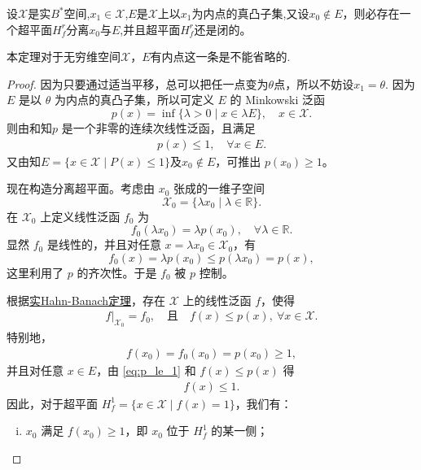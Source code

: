 \documentclass[../../main.tex]{subfiles}%
\begin{document}
\begin{theorem}\label{theorem:Hahn-Banach定理的几何形式}
设$\mathscr{X}$是实$B^*$空间,$x_1\in \mathscr{X}$,$E$是$\mathscr{X}$上以$x_1$为内点的真凸子集,又设$x_0 \notin E$，则必存在一个超平面$H_f^r$分离$x_0$与$E$,并且超平面$H_f^r$还是闭的。
\end{theorem}
\begin{remark}
本定理对于无穷维空间$\mathscr{X}$，$E$有内点这一条是不能省略的.
\end{remark}
\begin{proof}
因为只要通过适当平移，总可以把任一点变为$\theta$点，所以不妨设$x_1=\theta$.
因为 $E$ 是以 $\theta$ 为内点的真凸子集，所以可定义 $E$ 的 Minkowski 泛函
\[
p(x) = \inf\{\lambda > 0 \mid x \in \lambda E\}, \quad x \in \mathscr{X}.
\]
则由和知$p$ 是一个非零的连续次线性泛函，且满足
\begin{align}\label{eq:p_le_1}
p(x) \leqslant 1,\quad\forall x \in E.
\end{align}
又由知$E=\{x\in \mathscr{X}\mid P(x)\leqslant 1\}$及$x_0 \notin E$，可推出 $p(x_0) \geqslant 1$。

现在构造分离超平面。考虑由 $x_0$ 张成的一维子空间
\[
\mathscr{X}_0 = \{\lambda x_0 \mid \lambda \in \mathbb{R}\}.
\]
在 $\mathscr{X}_0$ 上定义线性泛函 $f_0$ 为
\[
f_0(\lambda x_0) = \lambda p(x_0), \quad \forall \lambda \in \mathbb{R}.
\]
显然 $f_0$ 是线性的，并且对任意 $x = \lambda x_0 \in \mathscr{X}_0$，有
\[
f_0(x) = \lambda p(x_0) \leqslant p(\lambda x_0) = p(x),
\]
这里利用了 $p$ 的齐次性。于是 $f_0$ 被 $p$ 控制。

根据\hyperref[theorem:泛函分析--实Hahn-Banach定理]{实Hahn-Banach定理}，存在 $\mathscr{X}$ 上的线性泛函 $f$，使得
\begin{align}
f|_{\mathscr{X}_0} = f_0, \quad \text{且} \quad f(x) \leqslant p(x),\ \forall x \in \mathscr{X}.\label{eq::FHJOIWJ421423}
\end{align}
特别地，
\begin{align}\label{eq:f_x0}
f(x_0) = f_0(x_0) = p(x_0) \geqslant 1,
\end{align}
并且对任意 $x \in E$，由 \eqref{eq:p_le_1} 和 $f(x) \leqslant p(x)$ 得
\begin{align}\label{eq:f_E}
f(x) \leqslant 1.
\end{align}
因此，对于超平面 $H_f^1 = \{x \in \mathscr{X} \mid f(x) = 1\}$，我们有：
\begin{enumerate}[(i)]
\item $x_0$ 满足 $f(x_0) \geqslant 1$，即 $x_0$ 位于 $H_f^1$ 的某一侧；


\end{enumerate}
\end{proof}
\end{document}
